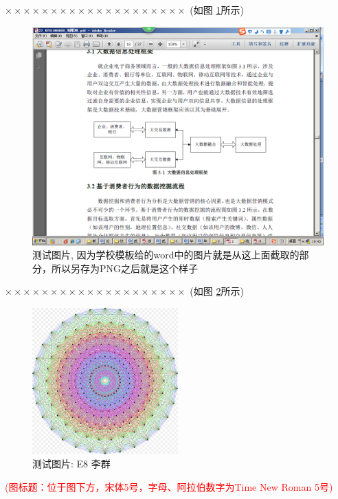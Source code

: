\documentclass[11pt,a4paper]{article}
\theoremstyle{definition} \newtheorem{law}[thm]{Law}
\theoremstyle{plain} \newtheorem{jury}[thm]{Jury}
\theoremstyle{remark} \newtheorem*{marg}{Margaret}
\newcommand{\reffig}[1]{图 \ref{#1}}
\numberwithin{equation}{section}
\begin{document}
$ \times\times\times\times\times\times\times\times\times\times\times\times\times\times\times\times\times\times\times\times $  (如\reffig{testfig}所示)
   	\begin{figure}[htbp]
   	\centering
   	\includegraphics[width=\textwidth]{testmindmap}
   	\caption{测试图片, 因为学校模板给的word中的图片就是从这上面截取的部分，所以另存为PNG之后就是这个样子}
   	\label{testfig}
   \end{figure}

$ \times\times\times\times\times\times\times\times\times\times\times\times\times\times\times\times\times\times\times\times $  (如\reffig{E8}所示)

\begin{figure}[htbp]
	\centering
	\includegraphics[width=0.5\textwidth]{E8Petrie}
	\caption{测试图片: E8 李群}
	\label{E8}
\end{figure}

\textcolor{red}{(图标题：位于图下方，宋体5号，字母、阿拉伯数字为Time New Roman 5号)}
 
\end{document}
